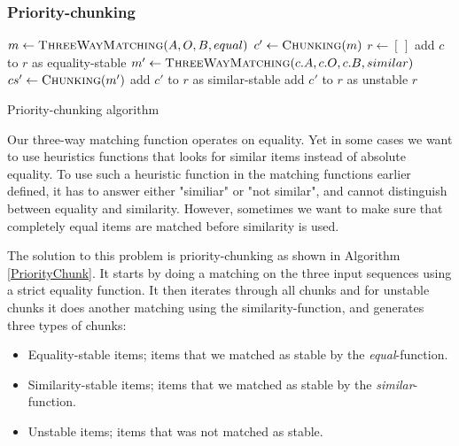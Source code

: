 \documentclass[11pt]{article}
\begin{document}
\subsubsection{Priority-chunking}
\label{PriorityDiff}

\begin{algorithm}
\begin{algorithmic}
	\State $m \gets \Call{ThreeWayMatching}{A, O, B, equal}$
	\State $c' \gets \Call{Chunking}{m}$
	\State $r \gets [\,]$
			\State add $c$ to $r$ as equality-stable
		\Else
			\State $m' \gets \Call{ThreeWayMatching}{c.A, c.O, c.B, similar} $
            \State $cs' \gets \Call{Chunking}{m'}$
					\State add $c'$ to $r$ as similar-stable
				\Else
					\State add $c'$ to $r$ as unstable
				\EndIf
			\EndFor
		\EndIf
	\EndFor
	\State \Return $r$
\EndFunction
\end{algorithmic}
	\caption{Priority-chunking algorithm}
	\label{PriorityChunk}
\end{algorithm}

Our three-way matching function operates on equality. Yet in some cases we want to use heuristics functions that looks for similar items instead of absolute equality. To use such a heuristic function in the matching functions earlier defined, it has to answer either "similiar" or "not similar", and cannot distinguish between equality and similarity. However, sometimes we want to make sure that completely equal items are matched before similarity is used.

The solution to this problem is priority-chunking as shown in Algorithm \ref{PriorityChunk}. It starts by doing a matching on the three input sequences using a strict equality function. It then iterates through all chunks and for unstable chunks it does another matching using the similarity-function, and generates three types of chunks:

\begin{itemize}
   \item Equality-stable items; items that we matched as stable by the \textit{equal}-function.
   \item Similarity-stable items; items that we matched as stable by the \textit{similar}-function.
   \item Unstable items; items that was not matched as stable.
\end{itemize}
\end{document}
